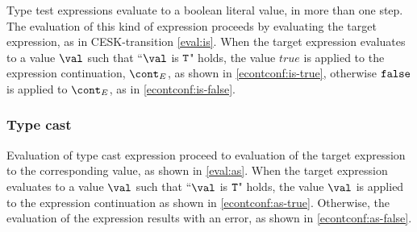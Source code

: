 \documentclass[a4paper,oneside]{article}
\begin{document}
Type test expressions evaluate to a boolean literal value, in more than one step.
The evaluation of this kind of expression proceeds by evaluating the target expression, as in CESK-transition \eqref{eval:is}.
When the target expression evaluates to a value $\val$ such that ``$\val $ is $\tt{T}$" holds, the value $true$ is applied to the expression continuation, $\econt$, as shown in \eqref{econtconf:is-true}, otherwise $\tt{false}$ is applied to $\econt$, as in \eqref{econtconf:is-false}.


\subsubsection{Type cast}
\label{subsubsec:type-cast}

Evaluation of type cast expression proceed to evaluation of the target expression to the corresponding value, as shown in \eqref{eval:as}.
When the target expression evaluates to a value $\val$ such that ``$\val $ is $\tt{T}$" holds, the value $\val$ is applied to the expression continuation as shown in \eqref{econtconf:as-true}.
Otherwise, the evaluation of the expression results with an error, as shown in \eqref{econtconf:as-false}.
\end{document}
